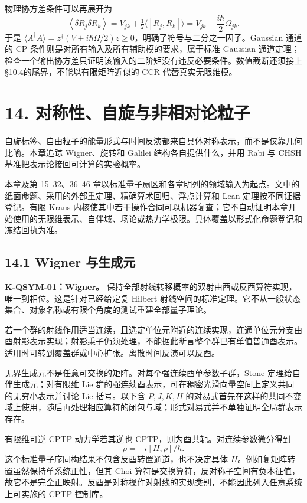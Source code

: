 \documentclass[
  11pt,
  oneside]{book}
\begin{document}
物理协方差条件可以再展开为 \[
\left\langle\delta R_j\delta R_k\right\rangle
=V_{jk}+\tfrac12\langle[R_j,R_k]\rangle
=V_{jk}+\frac{i\hbar}{2}\Omega_{jk}.
\] 于是
\(\langle A^\dagger A\rangle=z^\dagger(V+i\hbar\Omega/2)z\ge0\)，明确了符号与二分之一因子。Gaussian
通道的 CP 条件则是对所有输入及所有辅助模的要求，属于标准 Gaussian
通道定理；检查一个输出协方差只证明该输入的二阶矩没有违反必要条件。数值截断还须接上§10.4的尾界，不能以有限矩阵近似的
CCR 代替真实无限维模。

\chapter{14. 对称性、自旋与非相对论粒子}\label{ch-14}\hypertarget{ch-14}{}

自旋标签、自由粒子的能量形式与时间反演都来自具体对称表示，而不是仅靠几何比喻。本章追踪
Wigner、旋转和 Galilei 结构各自提供什么，并用 Rabi 与 CHSH
基准把表示论接回可计算的实验概率。

本章及第 15--32、36--46
章以标准量子扇区和各章明列的领域输入为起点。文中的纸面命题、采用的外部重定理、精确算术回归、浮点计算和
Lean 定理按不同证据登记。有限 Kraus
内核使其中若干操作合同可以机器复查；它不自动证明本章开始使用的无限维表示、自伴域、场论或热力学极限。具体覆盖以形式化命题登记和冻结回执为准。

\section{14.1 Wigner 与生成元}

\textbf{K-QSYM-01：Wigner。}
保持全部射线转移概率的双射由酉或反酉算符实现，唯一到相位。这是针对已经给定复
Hilbert
射线空间的标准定理。它不从一般状态集合、对象名称或有限个角度的测试重建全部量子理论。

若一个群的射线作用适当连续，且选定单位元附近的连续实现，连通单位元分支由酉射影表示实现；射影乘子仍须处理，不能据此断言整个群已有单值普通酉表示。适用时可转到覆盖群或中心扩张。离散时间反演可以反酉。

无界生成元不是任意可交换的矩阵。对每个强连续酉单参数子群，Stone
定理给自伴生成元；对有限维 Lie
群的强连续酉表示，可在稠密光滑向量空间上定义共同的无穷小表示并讨论 Lie
括号。以下含 \(P,J,K,H\)
的对易式首先在这样的共同不变域上使用，随后再处理相应算符的闭包与域；形式对易式并不单独证明全局群表示存在。

有限维可逆 CPTP 动力学若其逆也 CPTP，则为酉共轭。对连续参数微分得到 \[
\dot\rho=-i[H,\rho]/\hbar.
\] 这个标准量子序同构结果不包含反酉转置通道，也不决定具体
\(H\)。例如复矩阵转置虽然保持单系统正性，但其 Choi
算符是交换算符，反对称子空间有负本征值，故它不是完全正映射。反酉是对称操作对射线的实现类别，不能因此列入任意系统上可实施的
CPTP 控制库。
\end{document}
